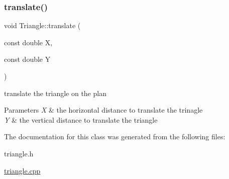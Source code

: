 \subsubsection{\texorpdfstring{translate()}{translate()}}
{\footnotesize\ttfamily void Triangle\+::translate (\begin{DoxyParamCaption}\item[{const double}]{X,  }\item[{const double}]{Y }\end{DoxyParamCaption})}



translate the triangle on the plan 


\begin{DoxyParams}{Parameters}
{\em X} & the horizontal distance to translate the trinagle \\
\hline
{\em Y} & the vertical distance to translate the triangle \\
\hline
\end{DoxyParams}


The documentation for this class was generated from the following files\+:\begin{DoxyCompactItemize}
\item 
triangle.\+h\item 
\hyperlink{triangle_8cpp}{triangle.\+cpp}\end{DoxyCompactItemize}
